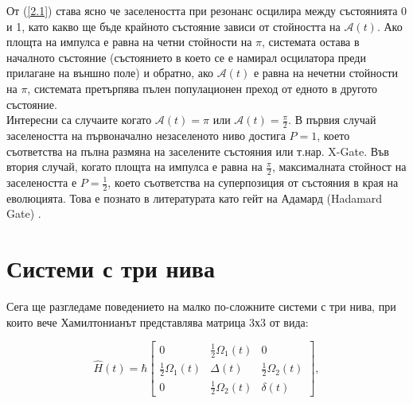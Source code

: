     От (\ref{2.1}) става ясно че заселеността при резонанс осцилира между състоянията 0 и 1, като какво ще бъде крайното състояние зависи от стойността на $\mathcal{A}(t)$.
    Ако площта на импулса е равна на четни стойности на $\pi$, системата остава в началното състояние (състоянието в което се е намирал осцилатора преди прилагане на външно поле) и
    обратно, ако $\mathcal{A}(t)$ е равна на нечетни стойности на $\pi$, системата претърпява пълен популационен преход от едното в другото състояние.\\
    Интересни са случаите когато $\mathcal{A}(t) = \pi$ или $\mathcal{A}(t) = \frac{\pi}{2}$. В първия случай заселеността на първоначално незаселеното ниво достига $P = 1$, което съответства на
    пълна размяна на заселените състояния или т.нар. X-Gate. Във втория случай, когато площта на импулса е равна на $\frac{\pi}{2}$, максималната стойност на заселеността е $P = \frac{1}{2}$,
    което съответства на суперпозиция от състояния в края на еволюцията. Това е познато в литературата като гейт на Адамард (Hadamard Gate) \nocite{vitanov2010quantum}.

    \section{Системи с три нива}

    Сега ще разгледаме поведението на малко по-сложните системи с три нива, при които вече Хамилтонианът представлява матрица 3х3 от вида:

    \begin{equation} \label{5.1}
        \hat{H}(t) = \hbar
        \begin{bmatrix}
            0 & \frac{1}{2}\Omega_1(t) & 0 \\
            \frac{1}{2}\Omega_1(t) & \Delta(t) & \frac{1}{2}\Omega_2(t) \\
            0 & \frac{1}{2}\Omega_2(t) & \delta(t)
        \end{bmatrix},
    \end{equation}

